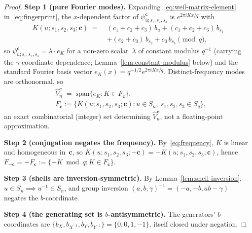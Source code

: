 \documentclass[11pt,a4paper]{article}
\begin{document}
    \begin{proof}
      \textbf{Step 1 (pure Fourier modes).}
      Expanding~\eqref{eq:weil-matrix-element} in~\eqref{eq:fingerprint}, the $x$-dependent factor of
      $\psi^{\mathbf{c}}_{u;s_1,s_2,s_3}$ is $e^{2\pi i K x / q}$ with
      \begin{equation}
        \label{eq:frequency}
        \begin{aligned}
          K(u;s_1,s_2,s_3;\mathbf{c}) \;=\;
          &(c_1{+}c_2{+}c_3)\, b_u
          + (c_1{+}c_2{+}c_3)\, b_{s_1} \\
          &+ (c_2{+}c_3)\, b_{s_2}
          + c_3\, b_{s_3}
          \pmod q,
        \end{aligned}
      \end{equation}
      so $\psi^{\mathbf{c}}_{u;s_1,s_2,s_3} = \lambda \cdot e_K$ for a non-zero scalar~$\lambda$ of
      constant modulus $q^{-1}$ (carrying the $\gamma$-coordinate dependence;
      Lemma~\ref{lem:constant-modulus} below) and the standard Fourier basis vector
      $e_K(x) = q^{-1/2} e^{2\pi i K x/q}$. Distinct-frequency modes are orthonormal, so
      \begin{equation}
        \begin{aligned}
          &\widehat V_n^{\mathbf{c}} \;=\; \mathrm{span}\{ e_K : K \in F_{\mathbf{c}} \}, \\
          &F_{\mathbf{c}} := \{ K(u;s_1,s_2,s_3;\mathbf{c}) : u \in S_n,\ s_1,s_2,s_3 \in S_q \},
        \end{aligned}
      \end{equation}
      an exact combinatorial (integer) set determining $\widehat V_n^{\mathbf{c}}$, not a
      floating-point approximation.

      \textbf{Step 2 (conjugation negates the frequency).}
      By~\eqref{eq:frequency}, $K$ is linear and homogeneous in~$\mathbf{c}$, so
      $K(u;s_1,s_2,s_3;-\mathbf{c}) = -K(u;s_1,s_2,s_3;\mathbf{c})$, hence
      $F_{-\mathbf{c}} = -F_{\mathbf{c}} := \{-K \bmod q : K \in F_{\mathbf{c}}\}$.

      \textbf{Step 3 (shells are inversion-symmetric).}
      By Lemma~\ref{lem:shell-inversion}, $u \in S_n \implies u^{-1} \in S_n$, and group inversion
      $(a,b,\gamma)^{-1}=(-a,-b,ab-\gamma)$ negates the $b$-coordinate.

      \textbf{Step 4 (the generating set is $b$-antisymmetric).}
      The generators' $b$-coordinates are $\{b_X, b_{X^{-1}}, b_Y, b_{Y^{-1}}\} = \{0,0,1,-1\}$,
      itself closed under negation.


\end{proof}
\end{document}
